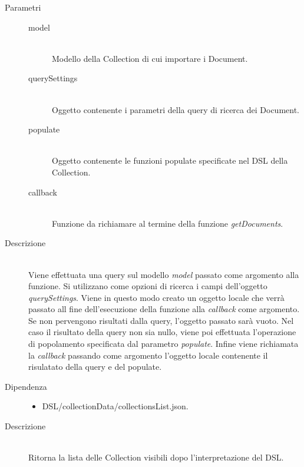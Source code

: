 \begin{description}
\begin{mldescription}
	 \hfill
		\begin{description}
			\item[Parametri] \hfill
			\begin{description}
				\item[model] \hfill \\
				Modello della Collection di cui importare i Document.
				\item[querySettings] \hfill \\
				Oggetto contenente i parametri della query di ricerca dei Document.
				\item[populate] \hfill \\
				Oggetto contenente le funzioni populate specificate nel DSL della Collection.
				\item[callback] \hfill \\
				Funzione da richiamare al termine della funzione \textit{getDocuments}.
			\end{description}
			\item[Descrizione] \hfill \\
			Viene effettuata una query sul modello \textit{model} passato come argomento alla funzione. Si utilizzano come opzioni di ricerca i campi dell'oggetto \textit{querySettings}. Viene in questo modo creato un oggetto locale che verrà passato all fine dell'esecuzione della funzione alla \textit{callback} come argomento. Se non pervengono risultati dalla query, l'oggetto passato sarà vuoto. Nel caso il risultato della query non sia nullo, viene poi effettuata l'operazione di popolamento specificata dal parametro \textit{populate}. Infine viene richiamata la \textit{callback} passando come argomento l'oggetto locale contenente il risulatato della query e del populate.
		\end{description}			
	 
	 \hfill 
		\begin{description}
			\item[Dipendenza] \hfill
				\begin{itemize}
					\item DSL/collectionData/collectionsList.json.
				\end{itemize}
			\item[Descrizione] \hfill \\
			Ritorna la lista delle Collection visibili dopo l'interpretazione del DSL. 
		\end{description}
		

\end{mldescription}
\end{description}
